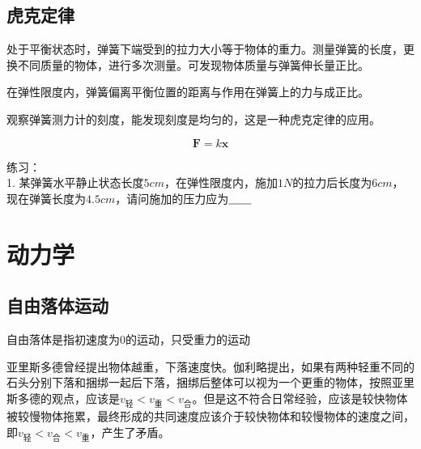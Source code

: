 \section{虎克定律}
\begin{wrapfigure}{l}{0cm}
\end{wrapfigure}
处于平衡状态时，弹簧下端受到的拉力大小等于物体的重力。测量弹簧的长度，更换不同质量的物体，进行多次测量。可发现物体质量与弹簧伸长量正比。

在弹性限度内，弹簧偏离平衡位置的距离与作用在弹簧上的力与成正比。

观察弹簧测力计的刻度，能发现刻度是均匀的，这是一种虎克定律的应用。

\begin{equation}
\bm{F}=k\bm{x}
\end{equation}

练习：\\
1. 某弹簧水平静止状态长度$5cm$，在弹性限度内，施加$1N$的拉力后长度为$6cm$，现在弹簧长度为$4.5cm$，请问施加的压力应为$\underline{\hbox to 7mm{}}$


\chapter{动力学}
\section{自由落体运动}
\begin{definition}
自由落体是指初速度为0的运动，只受重力的运动
\end{definition}

亚里斯多德曾经提出物体越重，下落速度快。伽利略提出，如果有两种轻重不同的石头分别下落和捆绑一起后下落，捆绑后整体可以视为一个更重的物体，按照亚里斯多德的观点，应该是$v_{\text{轻}}<v_{\text{重}}<v_{\text{合}}$。但是这不符合日常经验，应该是较快物体被较慢物体拖累，最终形成的共同速度应该介于较快物体和较慢物体的速度之间，即$v_{\text{轻}}<v_{\text{合}}<v_{\text{重}}$，产生了矛盾。

